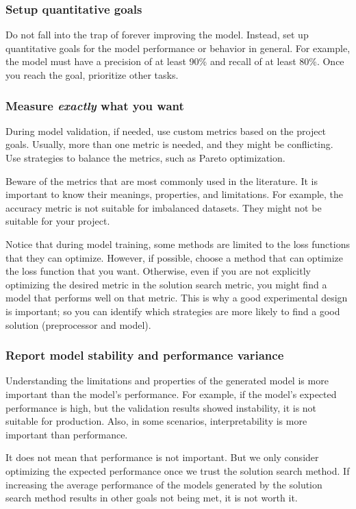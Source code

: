 \subsubsection{Setup quantitative goals}

Do not fall into the trap of forever improving the model. Instead, set up quantitative goals
for the model performance or behavior in general.  For example, the model must have a
precision of at least 90\% and recall of at least 80\%.  Once you reach the goal,
prioritize other tasks.

\subsubsection{Measure \emph{exactly} what you want}

During model validation, if needed, use custom metrics based on the project goals.
Usually, more than one metric is needed, and they might be conflicting.  Use strategies to
balance the metrics, such as Pareto optimization.

Beware of the metrics that are most commonly used in the literature.  It is important to know
their meanings, properties, and limitations.  For example, the accuracy metric is not suitable
for imbalanced datasets.  They might not be suitable for your project.

Notice that during model training, some methods are limited to the loss functions that
they can optimize.  However, if possible, choose a method that can optimize the loss
function that you want.  Otherwise, even if you are not explicitly optimizing the desired
metric in the solution search metric, you might find a model that performs well on that
metric.  This is why a good experimental design is important; so you can identify which
strategies are more likely to find a good solution (preprocessor and model).

\subsubsection{Report model stability and performance variance}

Understanding the limitations and properties of the generated model is more important
than the model's performance.  For example, if the model's expected performance is high, but
the validation results showed instability, it is not suitable for production.  Also, in
some scenarios, interpretability is more important than performance.

It does not mean that performance is not important.  But we only consider optimizing the
expected performance once we trust the solution search method.  If increasing the average
performance of the models generated by the solution search method results in other goals not
being met, it is not worth it.

